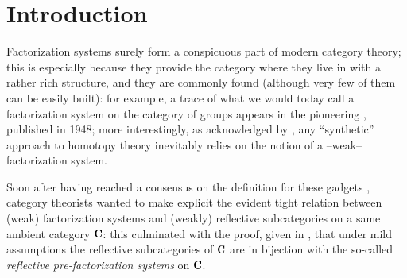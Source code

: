 \section*{Introduction}
Factorization systems surely form a conspicuous part of modern category theory; this is especially because they provide the category where they live in with a rather rich structure, and they are commonly found (although very few of them can be easily built): for example, a trace of what we would today call a factorization system on the category of groups appears in the pioneering \cite{maclane1948groups}, published in 1948; more interestingly, as acknowledged by \cite{whitehead61elements}, any ``synthetic'' approach to homotopy theory inevitably relies on the notion of a --weak-- factorization system.

Soon after having reached a consensus on the definition for these gadgets \cite{FK}, category theorists wanted to make explicit the evident tight relation between (weak) factorization systems and (weakly) reflective subcategories on a same ambient category $\C$: this culminated with the proof, given in \cite{CHK}, that under mild assumptions the reflective subcategories of $\C$ are in bijection with the so-called \emph{reflective pre-factorization systems} on $\C$. 

